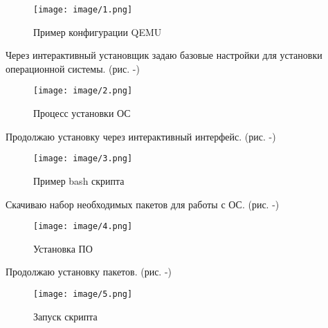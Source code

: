 \documentclass[
  12pt,
  a4paper,
  DIV=11,
  numbers=noendperiod]{scrreprt}
\begin{document}
\begin{figure}

{\centering \texttt{[image: image/1.png]}

}

\caption{Пример конфигурации QEMU}

\end{figure}%

Через интерактивный установщик задаю базовые настройки для установки
операционной системы. (рис. -\textcite{fig:002})

\begin{figure}

{\centering \texttt{[image: image/2.png]}

}

\caption{Процесс установки ОС}

\end{figure}%

Продолжаю установку через интерактивный интерфейс. (рис.
-\textcite{fig:003})

\begin{figure}

{\centering \texttt{[image: image/3.png]}

}

\caption{Пример bash скрипта}

\end{figure}%

Скачиваю набор необходимых пакетов для работы с ОС. (рис.
-\textcite{fig:004})

\begin{figure}

{\centering \texttt{[image: image/4.png]}

}

\caption{Установка ПО}

\end{figure}%

Продолжаю установку пакетов. (рис. -\textcite{fig:005})

\begin{figure}

{\centering \texttt{[image: image/5.png]}

}

\caption{Запуск скрипта}

\end{figure}%
\end{document}
